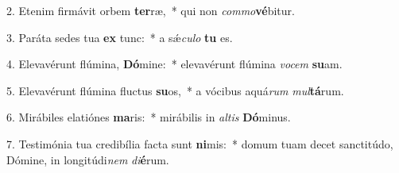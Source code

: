 2. Etenim firmávit orbem \textbf{ter}ræ,~*  qui non \textit{com}\textit{mo}\textbf{vé}bitur.\

3. Paráta sedes tua \textbf{ex} tunc:~*  a sǽ\textit{cu}\textit{lo} \textbf{tu} es.\

4. Elevavérunt flúmina, \textbf{Dó}mine:~*  elevavérunt flúmina \textit{vo}\textit{cem} \textbf{su}am.\

5. Elevavérunt flúmina fluctus \textbf{su}os,~*  a vócibus aquá\textit{rum} \textit{mul}\textbf{tá}rum.\

6. Mirábiles elatiónes \textbf{ma}ris:~*  mirábilis in \textit{al}\textit{tis} \textbf{Dó}minus.\

7. Testimónia tua credibília facta sunt \textbf{ni}mis:~*  domum tuam decet sanctitúdo, Dómine, in longitúdi\textit{nem} \textit{di}\textbf{é}rum.\

